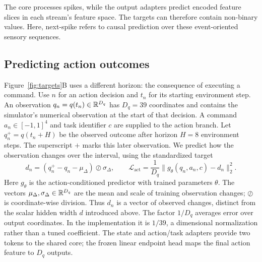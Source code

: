 The core processes spikes, while the output adapters predict encoded feature
slices in each stream's feature space. The targets can therefore contain
non-binary values. Here, next-spike refers to causal prediction over these
event-oriented sensory sequences.

\subsection{Predicting action outcomes}
Figure~\ref{fig:targets}B uses a different horizon: the consequence of executing
a command. Use $n$ for an action decision and $t_n$ for its starting environment step.
An observation $q_n=q(t_n)\in\mathbb{R}^{D_q}$ has $D_q=39$ coordinates and contains
the simulator's numerical observation at the start of that decision. A command
$a_n\in[-1,1]^4$ and task identifier $c$ are supplied to the action branch.
Let $q_n^+=q(t_n+H)$ be the observed outcome after horizon $H=8$ environment
steps. The superscript $+$ marks this later observation. We predict how the
observation changes over the interval, using the standardized target
\begin{equation}
 d_n=(q_n^+-q_n-\mu_\Delta)\oslash\sigma_\Delta,
 \qquad
 \mathcal L_{\mathrm{act}}=\frac{1}{D_q}
 \|g_\theta(q_n,a_n,c)-d_n\|_2^2.
 \label{eq:action}
\end{equation}
Here $g_\theta$ is the action-conditioned predictor with trained parameters
$\theta$. The vectors $\mu_\Delta,\sigma_\Delta\in\mathbb{R}^{D_q}$ are the mean and
scale of training observation changes; $\oslash$ is coordinate-wise division.
Thus $d_n$ is a vector of observed changes, distinct from the scalar hidden
width $d$ introduced above.
The factor $1/D_q$ averages error over output coordinates. In the implementation
it is $1/39$, a dimensional normalization rather than a tuned coefficient.
The state and action/task adapters provide two tokens to the shared core;
the frozen linear endpoint head maps the final action feature to $D_q$ outputs.

